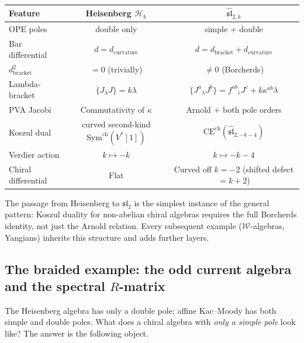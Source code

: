 \begin{center}
\small
\renewcommand{\arraystretch}{1.3}
\begin{tabular}{l|c|c}
\textbf{Feature} & \textbf{Heisenberg $\mathcal{H}_k$}
 & $\widehat{\mathfrak{sl}}_{2,k}$ \\
\hline
OPE poles & double only & simple $+$ double \\
Bar differential & $d = d_{\mathrm{curvature}}$
 & $d = d_{\mathrm{bracket}} + d_{\mathrm{curvature}}$ \\
$d_{\mathrm{bracket}}^2$ & $= 0$ (trivially)
 & $\neq 0$ (Borcherds) \\
Lambda-bracket & $\{J {}_\lambda J\} = k\lambda$
 & $\{J^a {}_\lambda J^b\} = f^{ab}{}_c J^c + k\kappa^{ab}\lambda$ \\
PVA Jacobi & Commutativity of $\kappa$
 & Arnold $+$ both pole orders \\
Koszul dual & curved second-kind $\mathrm{Sym}^{\mathrm{ch}}(V^*[1])$
 & $\mathrm{CE}^{\mathrm{ch}}(\widehat{\mathfrak{sl}}_{2,-k-4})$ \\
Verdier action & $k \mapsto -k$
 & $k \mapsto -k - 4$ \\
Chiral differential & Flat
 & Curved off $k=-2$ (shifted defect $= k+2$)
\end{tabular}
\end{center}

The passage from Heisenberg to $\widehat{\mathfrak{sl}}_2$ is the
simplest instance of the general pattern: Koszul duality for
non-abelian chiral algebras requires the full Borcherds identity,
not just the Arnold relation. Every subsequent example
($\mathcal{W}$-algebras, Yangians) inherits this structure and adds
further layers.

\subsection{The braided example: the odd current algebra and the spectral
$R$-matrix}
\label{subsec:rosetta-cs}

\providecommand{\hh}{\hbar}

The Heisenberg algebra has only a double pole; affine Kac--Moody
has both simple and double poles. What does a chiral algebra with
\emph{only a simple pole} look like? The answer is the following
object.

